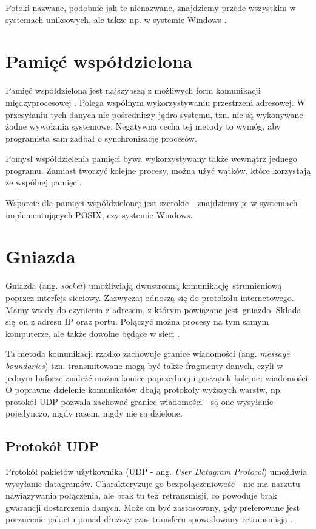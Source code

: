 Potoki nazwane, podobnie jak te nienazwane, znajdziemy przede wszystkim w systemach uniksowych, ale także np. w systemie Windows \cite{NAMED_PIPE_WIN}.


\section{Pamięć współdzielona}

Pamięć współdzielona jest najszybszą z możliwych form komunikacji międzyprocesowej \cite{Ste92}. Polega wspólnym wykorzystywaniu przestrzeni adresowej. W przesyłaniu tych danych nie pośredniczy jądro systemu, tzn. nie są wykonywane żadne wywołania systemowe. Negatywna cecha tej metody to wymóg, aby programista sam zadbał o synchronizację procesów.

Pomysł współdzielenia pamięci bywa wykorzystywany także wewnątrz jednego programu. Zamiast tworzyć kolejne procesy, można użyć wątków, które korzystają ze wspólnej pamięci.

Wsparcie dla pamięci współdzielonej jest szerokie - znajdziemy je w systemach implementujących POSIX, czy systemie Windows.

\section{Gniazda}

Gniazda (ang. \textit{socket}) umożliwiają dwustronną komunikację strumieniową poprzez interfejs sieciowy. Zazwyczaj odnoszą się do protokołu internetowego. Mamy wtedy do czynienia z adresem, z którym powiązane jest gniazdo. Składa się on z adresu IP oraz portu. Połączyć można procesy na tym samym komputerze, ale także dowolne będące w sieci \cite{sock_prgr}.

Ta metoda komunikacji rzadko zachowuje granice wiadomości (ang. \textit{message boundaries}) tzn. transmitowane mogą być także fragmenty danych, czyli w jednym buforze znaleźć można koniec poprzedniej i początek kolejnej wiadomości. O poprawne dzielenie komunikatów dbają protokoły wyższych warstw, np. protokół UDP pozwala zachować granice wiadomości - są one wysyłanie pojedynczo, nigdy razem, nigdy nie są dzielone.


\subsection{Protokół UDP}

Protokół pakietów użytkownika (UDP - ang. \textit{User Datagram Protocol}) umożliwia wysyłanie datagramów. Charakteryzuje go bezpołączeniowość - nie ma narzutu nawiązywania połączenia, ale brak tu też retransmisji, co powoduje brak gwarancji dostarczenia danych. Może on być zastosowany, gdy preferowane jest porzucenie pakietu ponad dłuższy czas transferu spowodowany retransmisją \cite{UDP_RFC}.


